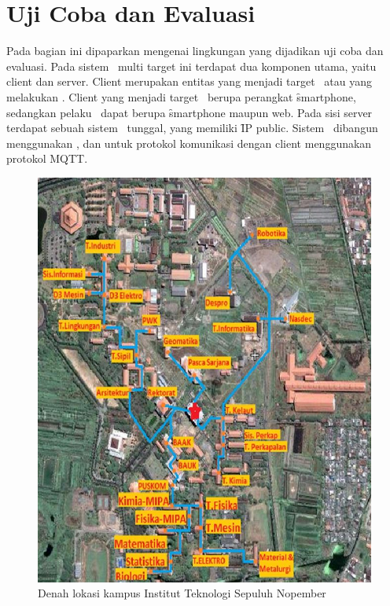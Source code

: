 \section{Uji Coba dan Evaluasi}

Pada bagian ini dipaparkan mengenai lingkungan yang dijadikan uji coba dan
evaluasi. Pada sistem \tracking~multi target ini terdapat dua komponen utama,
yaitu client dan server.  Client merupakan entitas yang menjadi target
\tracking~atau yang melakukan \tracking. Client yang menjadi target
\tracking~berupa perangkat \f{smartphone}, sedangkan pelaku \tracking~dapat
berupa \f{smartphone} maupun web. Pada sisi server terdapat sebuah sistem
\pubsub~tunggal, yang memiliki \f{IP public}. Sistem \pubsub~dibangun
menggunakan \activemq, dan untuk protokol komunikasi dengan client menggunakan
protokol MQTT.

\begin{figure}
    \centering
    \includegraphics[scale=0.32]
        {pics/its.png}
    \caption{Denah lokasi kampus Institut Teknologi Sepuluh Nopember}
\label{fig:its}
\end{figure}

